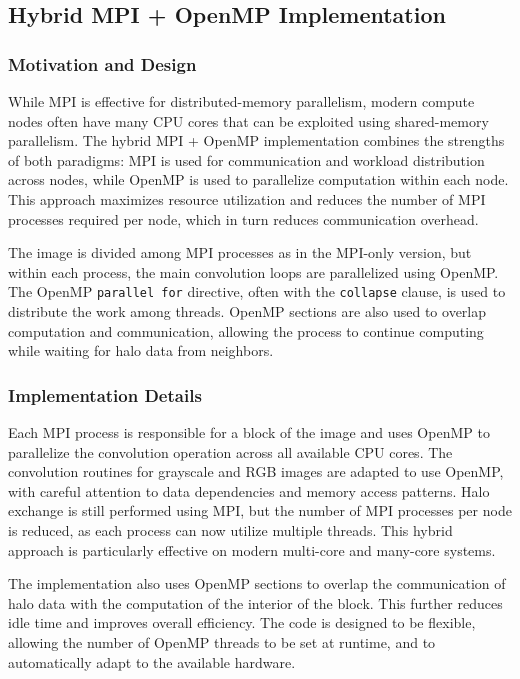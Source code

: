 \documentclass[conference, 10pt]{IEEEtran}
\begin{document}
\subsection{Hybrid MPI + OpenMP Implementation}
\subsubsection{Motivation and Design}
While MPI is effective for distributed-memory parallelism, modern compute nodes often have many CPU cores that can be exploited using shared-memory parallelism. The hybrid MPI + OpenMP implementation combines the strengths of both paradigms: MPI is used for communication and workload distribution across nodes, while OpenMP is used to parallelize computation within each node. This approach maximizes resource utilization and reduces the number of MPI processes required per node, which in turn reduces communication overhead.

The image is divided among MPI processes as in the MPI-only version, but within each process, the main convolution loops are parallelized using OpenMP. The OpenMP \texttt{parallel for} directive, often with the \texttt{collapse} clause, is used to distribute the work among threads. OpenMP sections are also used to overlap computation and communication, allowing the process to continue computing while waiting for halo data from neighbors.

\subsubsection{Implementation Details}
Each MPI process is responsible for a block of the image and uses OpenMP to parallelize the convolution operation across all available CPU cores. The convolution routines for grayscale and RGB images are adapted to use OpenMP, with careful attention to data dependencies and memory access patterns. Halo exchange is still performed using MPI, but the number of MPI processes per node is reduced, as each process can now utilize multiple threads. This hybrid approach is particularly effective on modern multi-core and many-core systems.

The implementation also uses OpenMP sections to overlap the communication of halo data with the computation of the interior of the block. This further reduces idle time and improves overall efficiency. The code is designed to be flexible, allowing the number of OpenMP threads to be set at runtime, and to automatically adapt to the available hardware.
\end{document}
